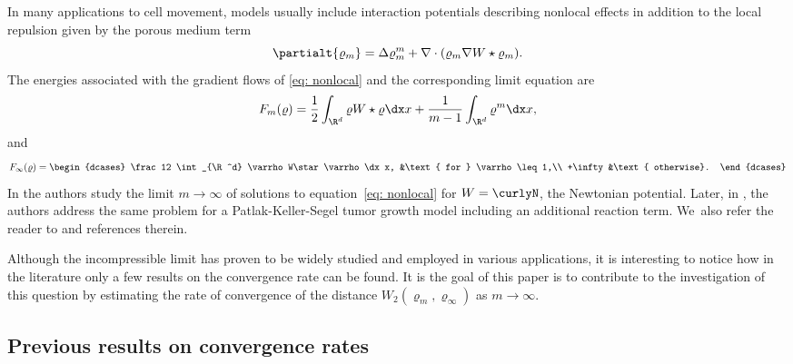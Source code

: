 In many applications to cell movement, models usually include interaction potentials describing nonlocal effects in addition to the local repulsion given by the porous medium term
\begin{equation}\label{eq: nonlocal}
\partialt{\varrho_m} = \Delta \varrho_m^m +\nabla\cdot(\varrho_m \nabla W\star \varrho_m).
\end{equation}
The energies associated with the gradient flows of \eqref{eq: nonlocal} and the corresponding limit equation are
\begin{equation*}
F_m(\varrho) = \frac 12 \int_{\R^d} \varrho W\star \varrho \dx x + \frac{1}{m-1}\int_{\R^d} \varrho^m \dx x,
\end{equation*}
and
\begin{equation*}
F_\infty(\varrho) =
\begin{dcases}
\frac 12 \int_{\R^d} \varrho W\star \varrho \dx x, &\text{ for } \varrho\leq 1,\\
+\infty &\text{ otherwise}.
\end{dcases}
\end{equation*}
In \cite{CKY18} the authors study the limit $m\to\infty$ of solutions to equation~\eqref{eq: nonlocal} for \hbox{$W=\curlyN$}, the Newtonian potential. Later, in \cite{perthamePKS}, the authors address the same problem for a Patlak-Keller-Segel tumor growth model including an additional reaction term. We~also refer the reader to \cite{CT2020, CG2021, CCY2019} and references therein.

Although the incompressible limit has proven to be widely studied and employed in various applications, it is interesting to notice how in the literature only a few results on the convergence rate can be found.
It is the goal of this paper is to contribute to the investigation of this question by estimating the rate of convergence of the distance $W_2(\varrho_m, \varrho_\infty)$ as $m \to \infty$.

\subsection{Previous results on convergence rates}


